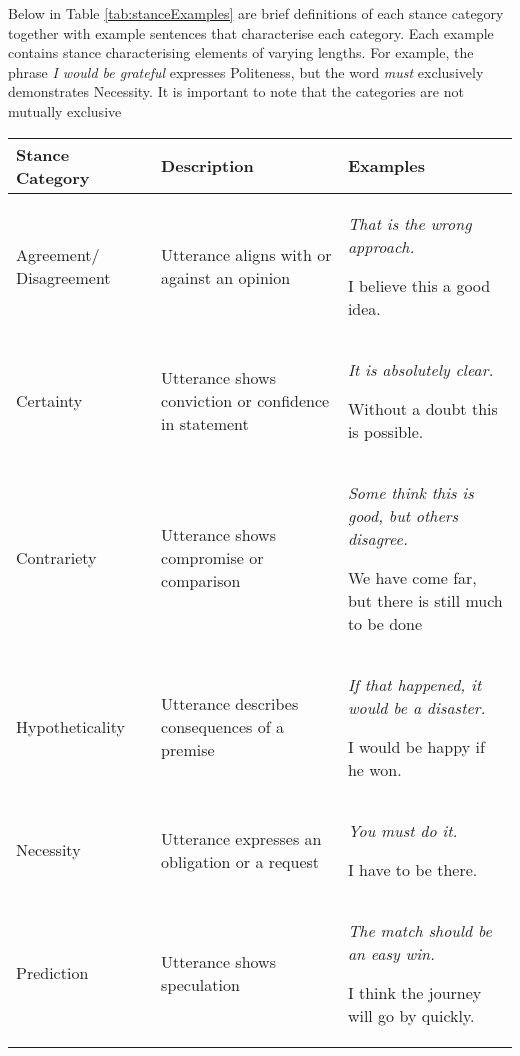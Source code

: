 \documentclass[Dissertation.tex]{subfiles}
\begin{document}
Below in Table \ref{tab:stanceExamples} are brief definitions of each stance category together with example sentences that characterise each category. Each example contains stance characterising elements of varying lengths. For example, the phrase \textit{I would be grateful} expresses Politeness, but the word \textit{must} exclusively demonstrates Necessity. It is important to note that the categories are not mutually exclusive
{\renewcommand{\arraystretch}{2.5}
	\centering
	\begin{table}[]
		
		\begin{tabularx}{\textwidth}{>{\raggedright}p{3cm} >{\raggedright}p{5.5cm} X}
			\toprule
			Stance Category        & Description                                            & Examples                                                                                                                                      \\ \midrule
			Agreement/ Disagreement &Utterance aligns with or against an opinion &\itshape That is the wrong approach. \par I believe this a good idea.\\
			Certainty              &Utterance shows conviction or confidence in statement& \itshape It is absolutely clear. \par Without a doubt this is possible.                                          \\
			Contrariety            & Utterance shows compromise or comparison               & \itshape Some think this is good, but others disagree.\par We have come far,  but there is still much to be done\\ 
			Hypotheticality        & Utterance describes consequences of a premise          &\itshape If that happened, it would be a disaster.\par I would be happy if he won.                              \\
			Necessity              & Utterance expresses an obligation or a request         & \itshape You must do it.\par I have to be there.                                                                \\
			Prediction             & Utterance shows speculation                            &\itshape The match should be an easy win.\par I think the journey will go by quickly.                           \\

\end{tabularx}
\end{table}}
\end{document}
